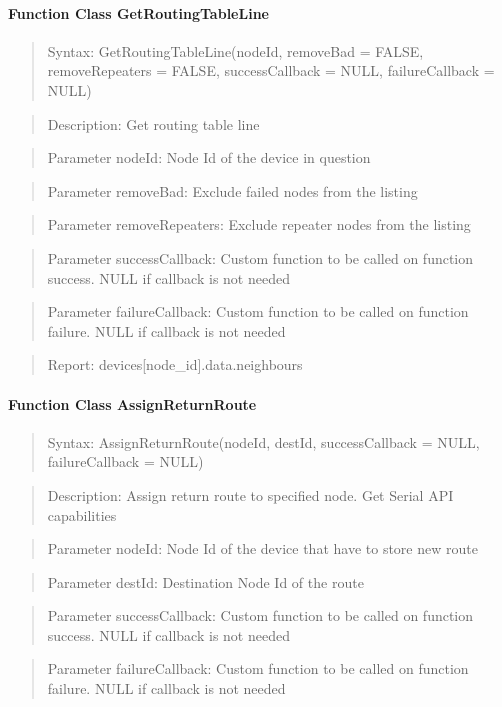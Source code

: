 \paragraph{Function Class GetRoutingTableLine}
\begin{quote}Syntax: GetRoutingTableLine(nodeId, removeBad = FALSE, removeRepeaters = FALSE, successCallback = NULL, failureCallback = NULL)\end{quote}
\begin{quote}Description: Get routing table line\end{quote}
\begin{quote}Parameter nodeId: Node Id of the device in question\end{quote}
\begin{quote}Parameter removeBad: Exclude failed nodes from the listing\end{quote}
\begin{quote}Parameter removeRepeaters: Exclude repeater nodes from the listing\end{quote}
\begin{quote}Parameter successCallback: Custom function to be called on function success. NULL if callback is not needed\end{quote}
\begin{quote}Parameter failureCallback: Custom function to be called on function failure. NULL if callback is not needed\end{quote}
\begin{quote}Report: devices[node\_id].data.neighbours\end{quote}

\paragraph{Function Class AssignReturnRoute}
\begin{quote}Syntax: AssignReturnRoute(nodeId, destId, successCallback = NULL, failureCallback = NULL)\end{quote}
\begin{quote}Description: Assign return route to specified node. Get Serial API capabilities\end{quote}
\begin{quote}Parameter nodeId: Node Id of the device that have to store new route\end{quote}
\begin{quote}Parameter destId: Destination Node Id of the route\end{quote}
\begin{quote}Parameter successCallback: Custom function to be called on function success. NULL if callback is not needed\end{quote}
\begin{quote}Parameter failureCallback: Custom function to be called on function failure. NULL if callback is not needed\end{quote}


